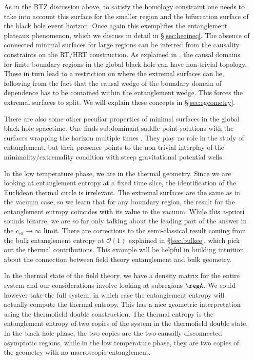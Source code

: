 \documentclass[12pt,openany]{book}
\begin{document}
As in the BTZ discussion above, to satisfy the homology constraint one needs to take into account this surface for the smaller region and the bifurcation surface of the black hole event horizon. Once again this exemplifies  the entanglement plateaux phenomenon, which we discuss in detail in \S\ref{sec:heeineq}. The absence of connected minimal surfaces for large regions can be inferred from the causality constraints on the RT/HRT construction. As explained in \cite{Hubeny:2013gba}, the causal domains for  finite boundary regions in the global  black hole can have non-trivial topology. These in turn lead to a restriction on where the extremal surfaces can lie, following from the fact that the causal wedge of the boundary domain of dependence has to be contained within the entanglement wedge. This forces the extremal surfaces to split. We will explain these concepts in  \S\ref{sec:egeometry}.

 There are also  some other peculiar properties of minimal surfaces in the global black hole spacetime. One finds subdominant saddle point solutions with the surfaces  wrapping the horizon multiple times  \cite{Hubeny:2013gta}. They play no role in the study of entanglement, but their presence points to the non-trivial interplay of the minimality/extremality condition with steep gravitational potential wells.

In the low temperature phase, we are in the thermal  geometry. Since we are looking at entanglement entropy at a fixed time slice, the identification of the Euclidean thermal circle is irrelevant. The extremal surfaces are the same as in the vacuum case, so we learn that for any boundary region, the result for the entanglement entropy coincides with its value in the vacuum. While this a-priori sounds bizarre, we are so far only talking about the leading part of the answer in the $c_\text{eff} \to \infty$ limit. There are corrections to the semi-classical result coming from the bulk entanglement entropy at $\mathcal{O}(1)$ explained in \S\ref{sec:bulkee}, which pick out the thermal contributions. This example will be helpful in building intuition about the connection between field theory entanglement and bulk geometry.


In the thermal state of the field theory, we have a density matrix for the entire system and our considerations involve looking at subregions $\regA$. We could however take the full system, in which case the entanglement entropy will actually compute the thermal entropy. This has a nice geometric interpretation using the thermofield double construction. The thermal entropy is the entanglement entropy of two copies of the system in the thermofield double state. In the black hole phase, the two copies are the two causally disconnected asymptotic regions, while in the low temperature phase, they are two copies of the \AdS{} geometry with no macroscopic entanglement.
\end{document}
